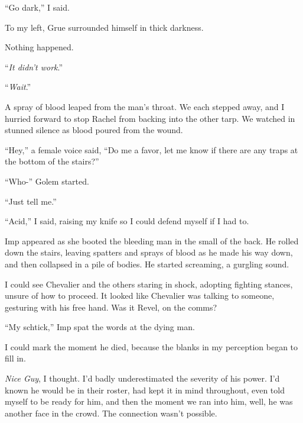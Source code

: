 ``Go dark,'' I said.



To my left, Grue surrounded himself in thick darkness.



Nothing happened.



``\emph{It didn't work}.''



``\emph{Wait}.''



A spray of blood leaped from the man's throat.  We each stepped away, and I hurried forward to stop Rachel from backing into the other tarp.  We watched in stunned silence as blood poured from the wound.



``Hey,'' a female voice said, ``Do me a favor, let me know if there are any traps at the bottom of the stairs?''



``Who-'' Golem started.



``Just tell me.''



``Acid,'' I said, raising my knife so I could defend myself if I had to.



Imp appeared as she booted the bleeding man in the small of the back.  He rolled down the stairs, leaving spatters and sprays of blood as he made his way down, and then collapsed in a pile of bodies.  He started screaming, a gurgling sound.



I could see Chevalier and the others staring in shock, adopting fighting stances, unsure of how to proceed.  It looked like Chevalier was talking to someone, gesturing with his free hand.  Was it Revel, on the comms?



``My schtick,'' Imp spat the words at the dying man.



I could mark the moment he died, because the blanks in my perception began to fill in.



\emph{Nice Guy}, I thought.  I'd badly underestimated the severity of his power.  I'd known he would be in their roster, had kept it in mind throughout, even told myself to be ready for him, and then the moment we ran into him, well, he was another face in the crowd.  The connection wasn't possible.



